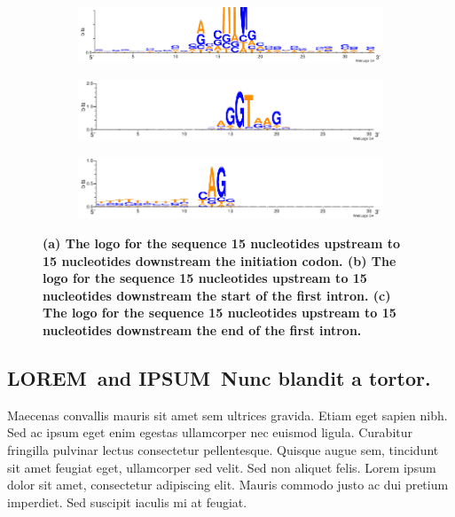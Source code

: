 \documentclass[10pt,letterpaper]{article}
\newcommand{\lorem}{{\bf LOREM}}
\newcommand{\ipsum}{{\bf IPSUM}}
\begin{document}
\begin{figure}[h]
\begin{subfigure}{.5\textwidth}
  \centering
  \includegraphics[width=5in]{../../results/2016-01-04/coding_sequences_logo.png}
  \caption{}
  \label{fig:sfig1}
\end{subfigure}%

\begin{subfigure}{.5\textwidth}
  \centering
  \includegraphics[width=5in]{../../results/2016-01-04/usg_intr_1_us_15.png}
  \caption{}
  \label{fig:sfig2}
\end{subfigure}

\begin{subfigure}{.5\textwidth}
  \centering
  \includegraphics[width=5in]{../../results/2016-01-04/usg_intr_1_ds_15.png}
  \caption{}
  \label{fig:sfig2}
\end{subfigure}
\caption{\bf (a) The logo for the sequence 15 nucleotides upstream to 15 nucleotides downstream the initiation codon. (b) The logo for the sequence 15 nucleotides upstream to 15 nucleotides downstream the start of the first intron. (c) The logo for the sequence 15 nucleotides upstream to 15 nucleotides downstream the end of the first intron.}
\label{fig1}
\end{figure}

\subsection*{\lorem\ and \ipsum\ Nunc blandit a tortor.}

Maecenas convallis mauris sit amet sem ultrices gravida. Etiam eget sapien nibh. Sed ac ipsum eget enim egestas ullamcorper nec euismod ligula. Curabitur fringilla pulvinar lectus consectetur pellentesque. Quisque augue sem, tincidunt sit amet feugiat eget, ullamcorper sed velit. Sed non aliquet felis. Lorem ipsum dolor sit amet, consectetur adipiscing elit. Mauris commodo justo ac dui pretium imperdiet. Sed suscipit iaculis mi at feugiat. 
\end{document}
